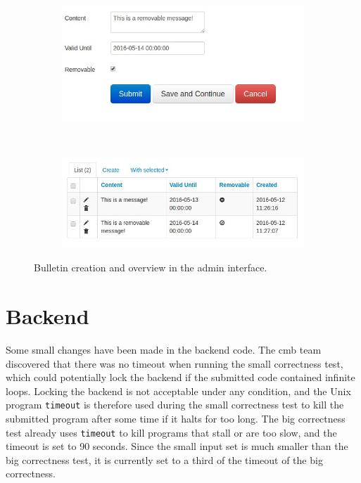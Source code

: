 \begin{figure}
    \centering
    \begin{subfigure}[b]{0.48\textwidth}
        \includegraphics[width=\textwidth]{figs/bulletin_creation.jpg}
    \end{subfigure}
    ~ %
    \begin{subfigure}[b]{0.48\textwidth}
        \includegraphics[width=\textwidth]{figs/bulletin_list.jpg}
    \end{subfigure}
    \caption{Bulletin creation and overview in the admin interface.}
    \label{fig:admin-bulletin}
\end{figure}

\section{Backend}
\label{sec:impr-backend}
Some small changes have been made in the backend code. The \gls{cmb} team discovered that there was no timeout when running the small correctness test, which could potentially lock the backend if the submitted code contained infinite loops. Locking the backend is not acceptable under any condition, and the Unix program \texttt{timeout} \cite{TIMEOUT} is therefore used during the small correctness test to kill the submitted program after some time if it halts for too long. The big correctness test already uses \texttt{timeout} to kill programs that stall or are too slow, and the timeout is set to 90 seconds. Since the small input set is much smaller than the big correctness test, it is currently set to a third of the timeout of the big correctness. \\

